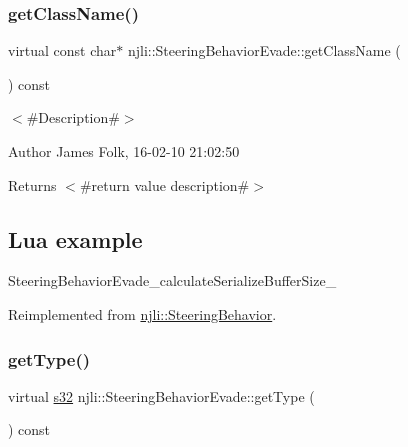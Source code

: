 \subsubsection{\texorpdfstring{get\+Class\+Name()}{getClassName()}}
{\footnotesize\ttfamily virtual const char$\ast$ njli\+::\+Steering\+Behavior\+Evade\+::get\+Class\+Name (\begin{DoxyParamCaption}{ }\end{DoxyParamCaption}) const\hspace{0.3cm}{\ttfamily [virtual]}}



$<$\#\+Description\#$>$ 

\begin{DoxyAuthor}{Author}
James Folk, 16-\/02-\/10 21\+:02\+:50
\end{DoxyAuthor}
\begin{DoxyReturn}{Returns}
$<$\#return value description\#$>$
\end{DoxyReturn}
\hypertarget{classnjli_1_1_steering_behavior_wander_ex1}{}\subsection{Lua example}\label{classnjli_1_1_steering_behavior_wander_ex1}

\begin{DoxyCodeInclude}
\end{DoxyCodeInclude}
Steering\+Behavior\+Evade\+\_\+calculate\+Serialize\+Buffer\+Size\+\_\+ 

Reimplemented from \mbox{\hyperlink{classnjli_1_1_steering_behavior_abb58d6982dc295fc3e90f096f51b0ef8}{njli\+::\+Steering\+Behavior}}.

\mbox{\label{classnjli_1_1_steering_behavior_evade_aea2cc17a1023812ec42851bf602ed3a2}} 
\subsubsection{\texorpdfstring{get\+Type()}{getType()}}
{\footnotesize\ttfamily virtual \mbox{\hyperlink{_util_8h_aa62c75d314a0d1f37f79c4b73b2292e2}{s32}} njli\+::\+Steering\+Behavior\+Evade\+::get\+Type (\begin{DoxyParamCaption}{ }\end{DoxyParamCaption}) const\hspace{0.3cm}{\ttfamily [virtual]}}



